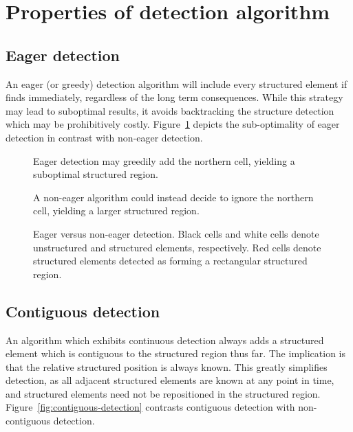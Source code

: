 \section{Properties of detection algorithm}

\subsection{Eager detection}
An eager (or greedy) detection algorithm will include every structured element if finds immediately, regardless of the long term consequences. While this strategy may lead to suboptimal results, it avoids backtracking the structure detection which may be prohibitively costly. Figure~\ref{fig:eager-detection} depicts the sub-optimality of eager detection in contrast with non-eager detection.


\begin{figure}

\sidebyside
{
	\drawmatrix[cell wd=0.6, cell ht=0.6]{\eagermatrix}
	\caption{Eager detection may greedily add the northern cell, yielding a suboptimal structured region.}
}
{
	\drawmatrix[cell wd=0.6, cell ht=0.6]{\noneagermatrix}
	\caption{A non-eager algorithm could instead decide to ignore the northern cell, yielding a larger structured region.}
}
\caption{Eager versus non-eager detection. Black cells and white cells denote unstructured and structured elements, respectively. Red cells denote structured elements detected as forming a rectangular structured region.\label{fig:eager-detection}}
\end{figure}



\subsection{Contiguous detection}
\label{subsec:contiguous-detection}
An algorithm which exhibits continuous detection always adds a structured element which is contiguous to the structured region thus far. The implication is that the relative structured position is always known. This greatly simplifies detection, as all adjacent structured elements are known at any point in time, and structured elements need not be repositioned in the structured region. Figure~\ref{fig:contiguous-detection} contrasts contiguous detection with non-contiguous detection.


